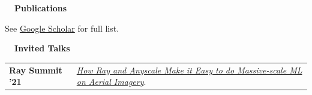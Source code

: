 \documentclass[a4paper,12pt]{article}
\newcommand{\resheading}[1]{{\vspace*{.001in} \colorbox{mygrey}{\begin{minipage}{\textwidth}{\textmd{\large \textbf{#1} \vphantom{p\^{E}}}}\end{minipage}}} }
\newcommand{\tabitem}{~~\llap{\textbullet}~~}
\begin{document}
    \resheading{~~Publications}
    \vspace{-1em}
    {\setlength{\parskip}{8pt}

    See \href{https://scholar.google.com/citations?user=4ODJ78oAAAAJ}{Google Scholar} for full list.\\
    



    }

    \resheading{~~Invited Talks}
    \vspace{-1.5em}

    \begin{tabularx}{\textwidth}{p{3cm}>{\arraybackslash}X}  %

        \bfseries{Ray Summit '21} & \href{https://www.anyscale.com/events/2021/06/22/how-ray-and-anyscale-make-it-easy-to-do-massive-scale-ml-on-aerial-imagery}{\textit{How Ray and Anyscale Make it Easy to do Massive-scale ML on Aerial Imagery}}.\\
    \end{tabularx}

\end{document}
